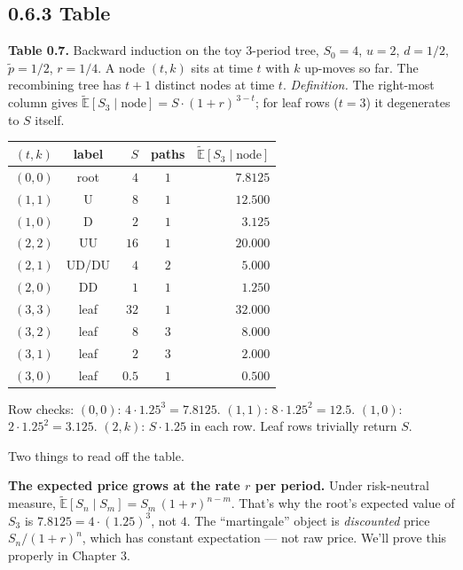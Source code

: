 \documentclass[
  10pt,
  twoside]{book}
\newcounter{none} %
\begin{document}
\subsection{0.6.3 Table}\label{table-3}

\textbf{Table 0.7.} Backward induction on the toy 3-period tree,
\(S_0 = 4\), \(u = 2\), \(d = 1/2\), \(\tilde p = 1/2\), \(r = 1/4\). A
node \((t, k)\) sits at time \(t\) with \(k\) up-moves so far. The
recombining tree has \(t+1\) distinct nodes at time \(t\).
\emph{Definition.} The right-most column gives
\(\tilde{\mathbb{E}}[S_3 \mid \text{node}] = S \cdot (1+r)^{\,3-t}\);
for leaf rows (\(t = 3\)) it degenerates to \(S\) itself.

{\def\LTcaptype{none} %
\begin{table}[H]
\centering
\begin{tabular}{|c|c|r|c|r|}
\toprule
\((t,k)\) & label & \(S\) & paths & \(\tilde{\mathbb{E}}[S_3 \mid \text{node}]\) \\
\midrule



\((0,0)\) & root & \(4\) & \(1\) & \(7.8125\) \\
\((1,1)\) & U & \(8\) & \(1\) & \(12.500\) \\
\((1,0)\) & D & \(2\) & \(1\) & \(3.125\) \\
\((2,2)\) & UU & \(16\) & \(1\) & \(20.000\) \\
\((2,1)\) & UD/DU & \(4\) & \(2\) & \(5.000\) \\
\((2,0)\) & DD & \(1\) & \(1\) & \(1.250\) \\
\((3,3)\) & leaf & \(32\) & \(1\) & \(32.000\) \\
\((3,2)\) & leaf & \(8\) & \(3\) & \(8.000\) \\
\((3,1)\) & leaf & \(2\) & \(3\) & \(2.000\) \\
\((3,0)\) & leaf & \(0.5\) & \(1\) & \(0.500\) \\
\bottomrule
\end{tabular}
\end{table}
}

Row checks: \((0,0)\): \(4 \cdot 1.25^3 = 7.8125\). \((1,1)\):
\(8 \cdot 1.25^2 = 12.5\). \((1,0)\): \(2 \cdot 1.25^2 = 3.125\).
\((2,k)\): \(S \cdot 1.25\) in each row. Leaf rows trivially return
\(S\).

Two things to read off the table.

\textbf{The expected price grows at the rate \(r\) per period.} Under
risk-neutral measure,
\(\tilde{\mathbb{E}}[S_n \mid S_m] = S_m \,(1+r)^{n-m}\). That's why the
root's expected value of \(S_3\) is \(7.8125 = 4 \cdot (1.25)^3\), not
\(4\). The ``martingale'' object is \emph{discounted} price
\(S_n/(1+r)^n\), which has constant expectation --- not raw price. We'll
prove this properly in Chapter 3.
\end{document}
